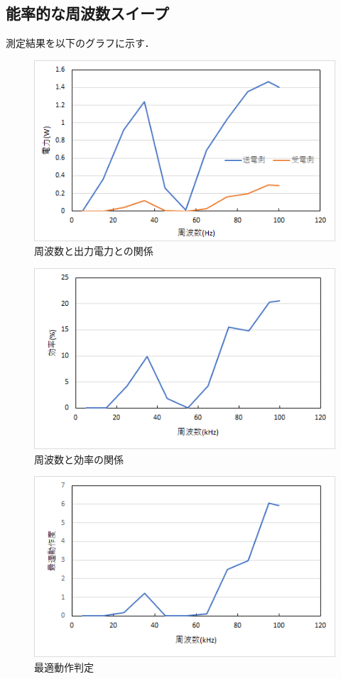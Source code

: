 \documentclass[12pt]{jarticle}
\begin{document}
\subsection{能率的な周波数スイープ}
測定結果を以下のグラフに示す．
\begin{figure}[H]
\centering
\includegraphics[]{nouritu_w.png}
\caption{周波数と出力電力との関係}
\label{fig:nourituw}
\end{figure}
\begin{figure}[H]
	\centering
	\includegraphics[]{nouritu_kou.png}
	\caption{周波数と効率の関係}
	\label{fig:nouritu_kou}
\end{figure}
\begin{figure}[H]
	\centering
	\includegraphics[]{nouritu_dousa.png}
	\caption{最適動作判定}
	\label{fig:nouritu_dousa}
\end{figure}
\clearpage
\end{document}

